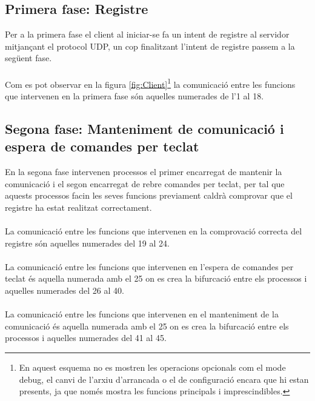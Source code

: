 \documentclass[11pt]{article}
\begin{document}
\subsection*{Primera fase: Registre}
Per a la primera fase el client al iniciar-se fa un intent de registre al servidor mitjançant el protocol UDP, un cop finalitzant l'intent de registre passem a la següent fase.
\\\\
Com es pot observar en la figura \ref{fig:Client}\footnote{En aquest esquema no es mostren les operacions opcionals com el mode debug, el canvi de l'arxiu d'arrancada o el de configuració encara que hi estan presents, ja que només mostra les funcions principals i imprescindibles.} la comunicació entre les funcions que intervenen en la primera fase són aquelles numerades de l'1 al 18.
\subsection*{Segona fase: Manteniment de comunicació i espera de comandes per teclat}
En la segona fase intervenen processos el primer encarregat de mantenir la comunicació i el segon encarregat de rebre comandes per teclat, per tal que aquests processos facin les seves funcions previament caldrà comprovar que el registre ha estat realitzat correctament.\\\\
La comunicació entre les funcions que intervenen en la comprovació correcta del registre són aquelles numerades del 19 al 24.\\\\
La comunicació entre les funcions que intervenen en l'espera de comandes per teclat és aquella numerada amb el 25 on es crea la bifurcació entre els processos i aquelles numerades del 26 al 40.\\\\
La comunicació entre les funcions que intervenen en el manteniment de la comunicació és aquella numerada amb el 25 on es crea la bifurcació entre els processos i aquelles numerades del 41 al 45.
\afterpage{\clearpage}
\end{document}

